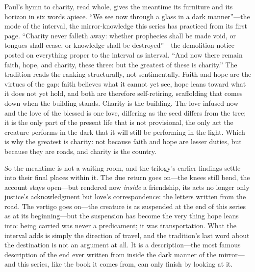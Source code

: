 Paul's hymn to charity, read whole, gives the meantime its furniture and its horizon in six words apiece. ``We see now through a glass in a dark manner''---the mode of the interval, the mirror-knowledge this series has practiced from its first page. ``Charity never falleth away: whether prophecies shall be made void, or tongues shall cease, or knowledge shall be destroyed''---the demolition notice posted on everything proper to the interval as interval. ``And now there remain faith, hope, and charity, these three: but the greatest of these is charity.'' The tradition reads the ranking structurally, not sentimentally. Faith and hope are the virtues of the gap: faith believes what it cannot yet see, hope leans toward what it does not yet hold, and both are therefore self-retiring, scaffolding that comes down when the building stands. Charity is the building. The love infused now and the love of the blessed is one love, differing as the seed differs from the tree; it is the only part of the present life that is not provisional, the only act the creature performs in the dark that it will still be performing in the light. Which is why the greatest is charity: not because faith and hope are lesser duties, but because they are roads, and charity is the country.

So the meantime is not a waiting room, and the trilogy's earlier findings settle into their final places within it. The due return goes on---the knees still bend, the account stays open---but rendered now \emph{inside} a friendship, its acts no longer only justice's acknowledgment but love's correspondence: the letters written from the road. The vertigo goes on---the creature is as suspended at the end of this series as at its beginning---but the suspension has become the very thing hope leans into: being carried was never a predicament; it was transportation. What the interval adds is simply the direction of travel, and the tradition's last word about the destination is not an argument at all. It is a description---the most famous description of the end ever written from inside the dark manner of the mirror---and this series, like the book it comes from, can only finish by looking at it.
